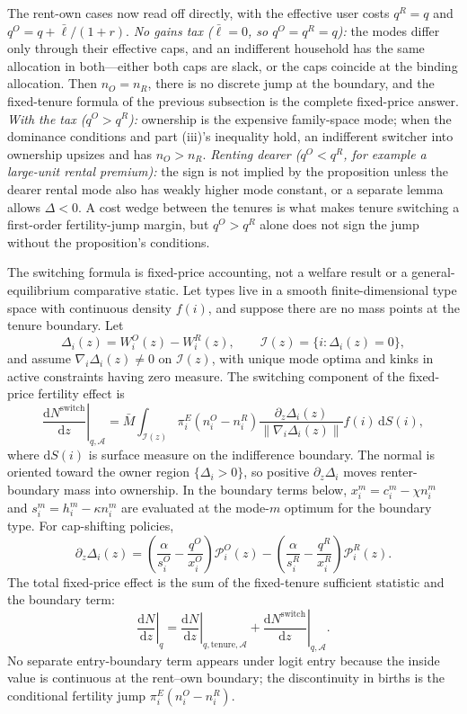 \documentclass[11pt]{article}
\newcommand{\dd}{\mathrm d}
\newcommand{\1}{\mathbf 1}
\begin{document}
The rent-own cases now read off directly, with the effective user costs $q^R=q$ and $q^O=q+\bar\ell/(1+r)$. \emph{No gains tax ($\bar\ell=0$, so $q^O=q^R=q$):} the modes differ only through their effective caps, and an indifferent household has the same allocation in both---either both caps are slack, or the caps coincide at the binding allocation. Then $n_O=n_R$, there is no discrete jump at the boundary, and the fixed-tenure formula of the previous subsection is the complete fixed-price answer. \emph{With the tax ($q^O>q^R$):} ownership is the expensive family-space mode; when the dominance conditions and part (iii)'s inequality hold, an indifferent switcher into ownership upsizes and has $n_O>n_R$. \emph{Renting dearer ($q^O<q^R$, for example a large-unit rental premium):} the sign is not implied by the proposition unless the dearer rental mode also has weakly higher mode constant, or a separate lemma allows $\Delta<0$. A cost wedge between the tenures is what makes tenure switching a first-order fertility-jump margin, but $q^O>q^R$ alone does not sign the jump without the proposition's conditions.

The switching formula is fixed-price accounting, not a welfare result or a general-equilibrium comparative static. Let types live in a smooth finite-dimensional type space with continuous density $f(i)$, and suppose there are no mass points at the tenure boundary. Let
\[
\Delta_i(z)=W_i^O(z)-W_i^R(z),
\qquad
\mathcal I(z)=\{i:\Delta_i(z)=0\},
\]
and assume $\nabla_i\Delta_i(z)\ne0$ on $\mathcal I(z)$, with unique mode optima and kinks in active constraints having zero measure. The switching component of the fixed-price fertility effect is
\[
\left.\frac{\dd N^{\mathrm{switch}}}{\dd z}\right|_{q,\mathcal A}
=
\bar M
\int_{\mathcal I(z)}
\pi_i^E
\left(n_i^O-n_i^R\right)
\frac{\partial_z\Delta_i(z)}
{\|\nabla_i\Delta_i(z)\|}
f(i)\,\dd S(i),
\]
where $\dd S(i)$ is surface measure on the indifference boundary. The normal is oriented toward the owner region $\{\Delta_i>0\}$, so positive $\partial_z\Delta_i$ moves renter-boundary mass into ownership. In the boundary terms below, $x_i^m=c_i^m-\chi n_i^m$ and $s_i^m=h_i^m-\kappa n_i^m$ are evaluated at the mode-$m$ optimum for the boundary type.
For cap-shifting policies,
\[
\partial_z\Delta_i(z)
=
\left(
\frac{\alpha}{s_i^O}-\frac{q^O}{x_i^O}
\right)
\mathcal P_i^O(z)
-
\left(
\frac{\alpha}{s_i^R}-\frac{q^R}{x_i^R}
\right)
\mathcal P_i^R(z).
\]
The total fixed-price effect is the sum of the fixed-tenure sufficient statistic and the boundary term:
\[
\left.\frac{\dd N}{\dd z}\right|_q
=
\left.\frac{\dd N}{\dd z}\right|_{q,\mathrm{tenure},\mathcal A}
+
\left.\frac{\dd N^{\mathrm{switch}}}{\dd z}\right|_{q,\mathcal A}.
\]
No separate entry-boundary term appears under logit entry because the inside value is continuous at the rent--own boundary; the discontinuity in births is the conditional fertility jump $\pi_i^E(n_i^O-n_i^R)$.
\end{document}
